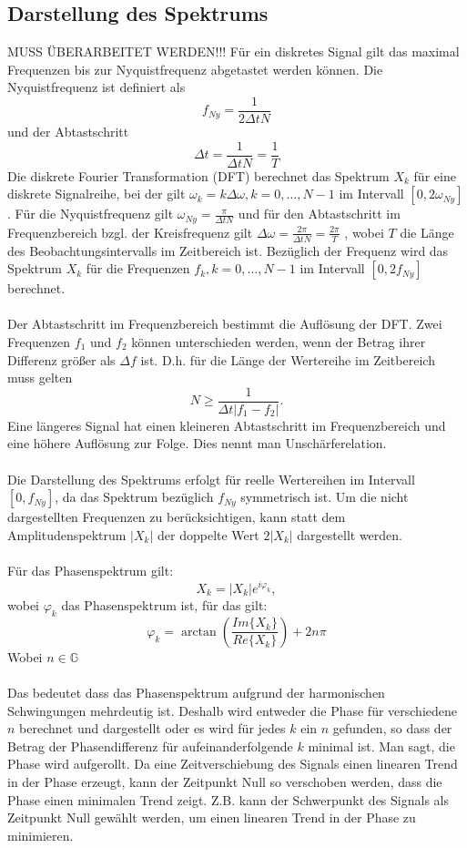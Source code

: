 \subsection{Darstellung des Spektrums}
{\color{red} MUSS ÜBERARBEITET WERDEN!!!}
Für ein diskretes Signal gilt das maximal Frequenzen bis zur Nyquistfrequenz abgetastet werden können. Die Nyquistfrequenz ist definiert als
\begin{equation}
f_{Ny} = \frac {1} {2 \Delta t N}
\end{equation}
und der Abtastschritt
\[
\Delta t =\frac{1}{\Delta t N} = \frac{1}{T}
\]
Die diskrete Fourier Transformation (DFT) berechnet das Spektrum $X_k$ für eine diskrete Signalreihe, bei der gilt $\omega_k= k \Delta \omega, k=0,\dots, N-1$ im Intervall $[0,2\omega_{Ny}]$. Für die Nyquistfrequenz gilt $\omega_{Ny} = \frac {\pi} {\Delta t N}$ und für den Abtastschritt im Frequenzbereich bzgl. der Kreisfrequenz gilt $\Delta\omega=\frac{2\pi}{\Delta t N} = \frac{2\pi}{T}$ , wobei $T$ die Länge des Beobachtungsintervalls im Zeitbereich ist. Bezüglich der Frequenz wird das Spektrum $X_k$ für die Frequenzen  $f_k, k=0,\dots, N-1$ im Intervall $[0,2f_{Ny}]$ berechnet.\\\\
Der Abtastschritt im Frequenzbereich bestimmt die Auflösung der DFT. Zwei Frequenzen $f_1$ und $f_2$ können unterschieden werden, wenn der Betrag ihrer Differenz größer als $ \Delta f$ ist. D.h. für die Länge der Wertereihe im Zeitbereich muss  gelten
\[
N \ge \frac{1}{\Delta t | f_1 - f_2 |}.
\]
Eine längeres Signal hat einen kleineren Abtastschritt im Frequenzbereich und eine höhere Auflösung zur Folge. Dies nennt man Unschärferelation.\\\\
Die Darstellung des Spektrums erfolgt für reelle Wertereihen im Intervall $[0,f_{Ny}]$, da das Spektrum bezüglich $f_{Ny}$ symmetrisch ist. Um die nicht dargestellten Frequenzen zu berücksichtigen, kann statt dem Amplitudenspektrum $|X_k|$ der doppelte Wert $2|X_k|$ dargestellt werden.\\\\
Für das Phasenspektrum gilt:
\[
X_k= |X_k|e^{i\varphi_k},
\]
wobei $\varphi_k$ das Phasenspektrum ist, für das gilt:
\[
\varphi_k = \arctan \left(\frac{Im\{X_k\}}{Re\{X_k\}}\right) + 2n\pi
\]
Wobei $n \in \mathbb{G}$\\\\
Das bedeutet dass das Phasenspektrum aufgrund der harmonischen Schwingungen mehrdeutig ist. Deshalb wird entweder die Phase für verschiedene $n$ berechnet und dargestellt oder es wird für jedes $k$ ein $n$ gefunden, so dass der Betrag der Phasendifferenz für aufeinanderfolgende $k$ minimal ist. Man sagt, die Phase wird aufgerollt. Da eine Zeitverschiebung des Signals einen linearen Trend in der Phase erzeugt, kann der Zeitpunkt Null so verschoben werden, dass die Phase einen minimalen Trend zeigt. Z.B. kann der Schwerpunkt des Signals als Zeitpunkt Null gewählt werden, um einen linearen Trend in der Phase zu minimieren.

